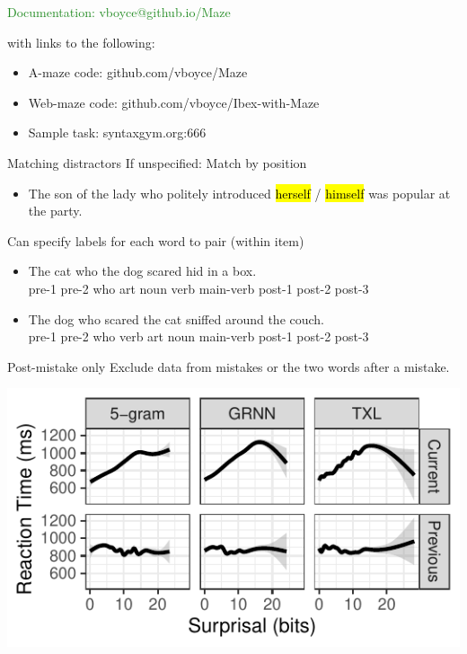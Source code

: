 \documentclass[12pt, xcolor=beamer,table,usenames,dvipsnames, ignorenonframetext, ngerman]{beamer}
\makeatletter
\let\HL\hl
\renewcommand\hl{%
	\let\set@color\beamerorig@set@color
	\let\reset@color\beamerorig@reset@color
	\HL}
\makeatother
\begin{document}
\begin{frame}{}

\textcolor{ForestGreen}{\large Documentation: vboyce@github.io/Maze}

with links to the following:
\begin{itemize}

\item A-maze code: github.com/vboyce/Maze

\item Web-maze code: github.com/vboyce/Ibex-with-Maze

\item Sample task: syntaxgym.org:666
\end{itemize}
\end{frame}


\appendix

\begin{frame}{Matching distractors}
If unspecified: Match by position
\begin{itemize}
	\item The son of the lady who politely introduced  \hl{herself} / \hl{himself} was popular at the party.
\end{itemize}
Can specify labels for each word to pair (within item)
\begin{itemize}
	\item The cat who the dog scared hid in a box.\\pre-1 pre-2 who art noun verb main-verb post-1 post-2 post-3
\item The dog who scared the cat sniffed around the couch.\\ pre-1 pre-2 who verb art noun main-verb post-1 post-2 post-3
\end{itemize}
\end{frame}

\begin{frame}{Post-mistake only}
Exclude data from mistakes or the two words after a mistake. 


\includegraphics[]{gam3.pdf}	
\end{frame}
\end{document}
